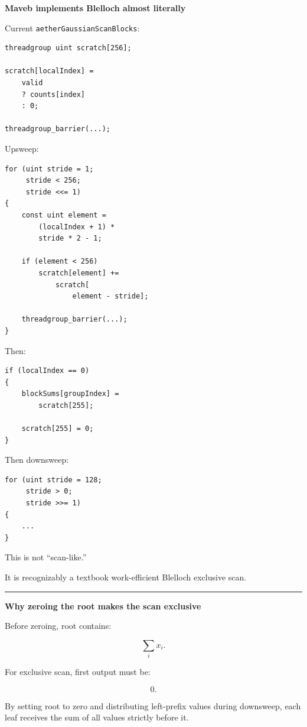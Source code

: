 \textbf{Maveb implements Blelloch almost literally}

Current \texttt{aetherGaussianScanBlocks}:

\protect{}\label{4ie3j5}%
\begin{verbatim}
threadgroup uint scratch[256];

scratch[localIndex] =
    valid
    ? counts[index]
    : 0;

threadgroup_barrier(...);
\end{verbatim}

Upsweep:

\protect{}\label{5188rr}%
\begin{verbatim}
for (uint stride = 1;
     stride < 256;
     stride <<= 1)
{
    const uint element =
        (localIndex + 1) *
        stride * 2 - 1;

    if (element < 256)
        scratch[element] +=
            scratch[
                element - stride];

    threadgroup_barrier(...);
}
\end{verbatim}

Then:

\protect{}\label{sz0hjf}%
\begin{verbatim}
if (localIndex == 0)
{
    blockSums[groupIndex] =
        scratch[255];

    scratch[255] = 0;
}
\end{verbatim}

Then downsweep:

\protect{}\label{67v40p}%
\begin{verbatim}
for (uint stride = 128;
     stride > 0;
     stride >>= 1)
{
    ...
}
\end{verbatim}

This is not ``scan-like.''

It is recognizably a textbook work-efficient Blelloch exclusive scan.

\begin{center}\rule{0.5\linewidth}{0.5pt}\end{center}

\textbf{Why zeroing the root makes the scan exclusive}

Before zeroing, root contains:

\[
\sum_i x_i.
\]

For exclusive scan, first output must be:

\[
0.
\]

By setting root to zero and distributing left-prefix values during downsweep, each leaf receives the sum of all values strictly before it.

